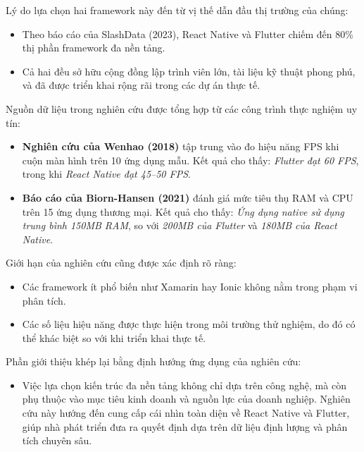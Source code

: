 \begin{flushleft}
    \hspace*{0.8cm}Lý do lựa chọn hai framework này đến từ vị thế dẫn đầu thị trường của chúng:
    \setlength{\leftmargini}{1.0cm}
    \begin{itemize}
        \item Theo báo cáo của SlashData (2023), React Native và Flutter chiếm đến 80\% thị phần framework đa nền tảng.
        \item Cả hai đều sở hữu cộng đồng lập trình viên lớn, tài liệu kỹ thuật phong phú, và đã được triển khai rộng rãi trong các dự án thực tế.
    \end{itemize}
\end{flushleft}

\begin{flushleft}
    \hspace*{0.8cm}Nguồn dữ liệu trong nghiên cứu được tổng hợp từ các công trình thực nghiệm uy tín:
    \setlength{\leftmargini}{1.0cm}
    \begin{itemize}
        \item \textbf{Nghiên cứu của Wenhao (2018)} tập trung vào đo hiệu năng FPS khi cuộn màn hình trên 10 ứng dụng mẫu. Kết quả cho thấy: \textit{Flutter đạt 60 FPS}, trong khi \textit{React Native đạt 45–50 FPS}.
        
        \item \textbf{Báo cáo của Biorn-Hansen (2021)} đánh giá mức tiêu thụ RAM và CPU trên 15 ứng dụng thương mại. Kết quả cho thấy: \textit{Ứng dụng native sử dụng trung bình 150MB RAM}, so với \textit{200MB của Flutter} và \textit{180MB của React Native}.
    \end{itemize}
\end{flushleft}

\begin{flushleft}
    \hspace*{0.8cm}Giới hạn của nghiên cứu cũng được xác định rõ ràng:
    \setlength{\leftmargini}{1.0cm}
    \begin{itemize}
        \item Các framework ít phổ biến như Xamarin hay Ionic không nằm trong phạm vi phân tích.
        \item Các số liệu hiệu năng được thực hiện trong môi trường thử nghiệm, do đó có thể khác biệt so với khi triển khai thực tế.
    \end{itemize}
\end{flushleft}

\begin{flushleft}
    \hspace*{0.8cm}Phần giới thiệu khép lại bằng định hướng ứng dụng của nghiên cứu:
    \setlength{\leftmargini}{1.0cm}
    \begin{itemize}
        \item Việc lựa chọn kiến trúc đa nền tảng không chỉ dựa trên công nghệ, mà còn phụ thuộc vào mục tiêu kinh doanh và nguồn lực của doanh nghiệp. Nghiên cứu này hướng đến cung cấp cái nhìn toàn diện về React Native và Flutter, giúp nhà phát triển đưa ra quyết định dựa trên dữ liệu định lượng và phân tích chuyên sâu.
    \end{itemize}
\end{flushleft}
